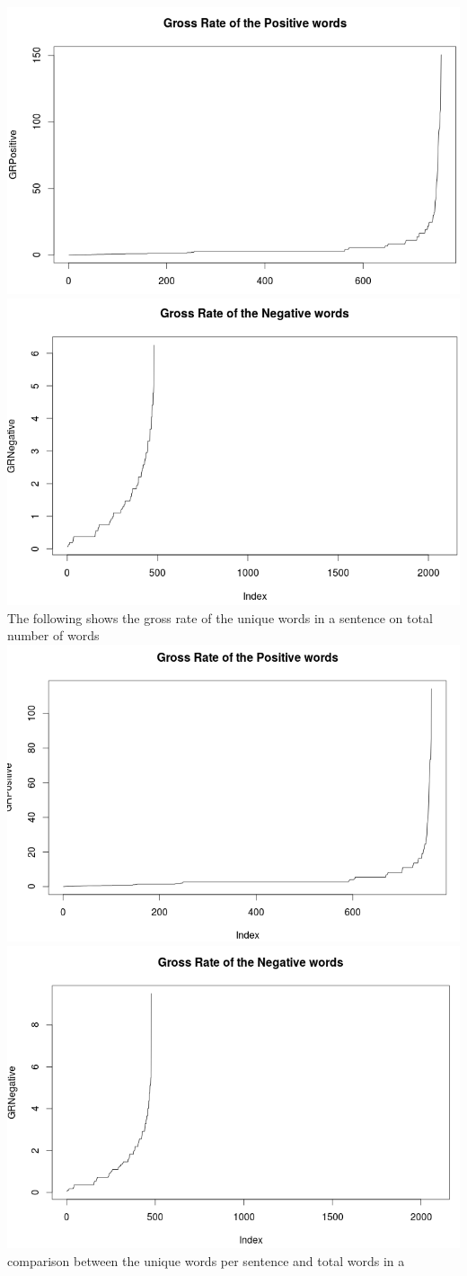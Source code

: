 \documentclass{article}
\begin{document}
\includegraphics[width=0.6\linewidth]{vis_GR.png}\includegraphics[width=0.6\linewidth]{vis_GR3.png}\\
The following shows the gross rate of the unique words in a sentence on total number of words\\
\includegraphics[width=0.6\linewidth]{vis_GR2.png}\includegraphics[width=0.6\linewidth]{vis_GR4.png}\\
comparison between the unique words per sentence and total words in a \\
\end{document}
